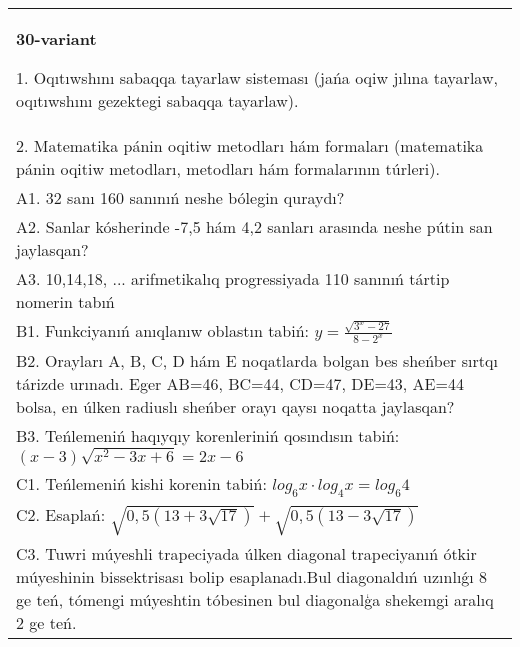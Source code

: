 \documentclass{article}
\begin{document}
\begin{tabular}{m{17cm}}
\textbf{30-variant}

1. Oqıtıwshını sabaqqa tayarlaw sisteması (jańa oqiw jılına tayarlaw, oqıtıwshını gezektegi sabaqqa tayarlaw). \\
2. Matematika pánin oqitiw metodları hám formaları (matematika pánin oqitiw metodları, metodları hám formalarının túrleri). \\
A1. 32 sanı 160 sanınıń neshe bólegin quraydı? \\
A2. Sanlar kósherinde -7,5 hám 4,2 sanları arasında neshe pútin san jaylasqan? \\
A3. 10,14,18, ... arifmetikalıq progressiyada 110 sanınıń tártip nomerin tabıń \\
B1. Funkciyanıń anıqlanıw oblastın tabiń: \(y = \frac{\sqrt{3^{x} - 27}}{8 - 2^{x}}\) \\
B2. Orayları A, B, C, D hám E noqatlarda bolgan bes sheńber sırtqı tárizde urınadı. Eger AB=46, BC=44, CD=47, DE=43, AE=44 bolsa, en úlken radiuslı sheńber orayı qaysı noqatta jaylasqan? \\
B3. Teńlemeniń haqıyqıy korenleriniń qosındısın tabiń: \((x-3) \sqrt{x^{2} - 3x + 6} = 2x - 6\) \\
C1. Teńlemeniń kishi korenin tabiń: \(log_{6}x \cdot log_{4}x = log_{6}4\) \\
C2. Esaplań: \(\sqrt{0,5 (13 + 3\sqrt{17}) } + \sqrt{0,5 (13 - 3\sqrt{17}) }\) \\
C3. Tuwri múyeshli trapeciyada úlken diagonal trapeciyanıń ótkir múyeshinin bissektrisası bolip esaplanadı.Bul diagonaldıń uzınlıǵı 8 ge teń, tómengi múyeshtin tóbesinen bul diagonalģa shekemgi aralıq 2 ge teń. \\

\end{tabular}
\vspace{1cm}
\end{document}
